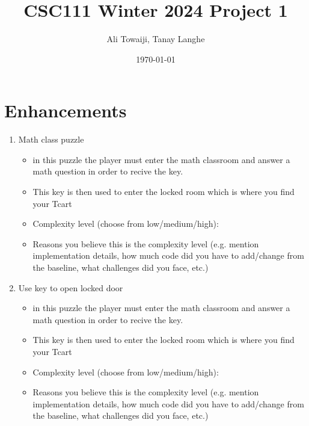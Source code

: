 \documentclass[11pt]{article}
\title{CSC111 Winter 2024 Project 1}
\author{Ali Towaiji, Tanay Langhe}
\date{\today}
\begin{document}
\maketitle

\section*{Enhancements}


\begin{enumerate}

\item Math class puzzle
	\begin{itemize}
	\item in this puzzle the player must enter the math classroom and answer a math question in order to recive the key.
	\item This key is then used to enter the locked room which is where you find your Tcart
	\item Complexity level (choose from low/medium/high):
	\item Reasons you believe this is the complexity level (e.g. mention implementation details, how much code did you have to add/change from the baseline, what challenges did you face, etc.)
	\end{itemize}

\item Use key to open locked door
	\begin{itemize}
	\item in this puzzle the player must enter the math classroom and answer a math question in order to recive the key.
	\item This key is then used to enter the locked room which is where you find your Tcart
	\item Complexity level (choose from low/medium/high):
	\item Reasons you believe this is the complexity level (e.g. mention implementation details, how much code did you have to add/change from the baseline, what challenges did you face, etc.)
	\end{itemize}


\end{enumerate}
\end{document}
